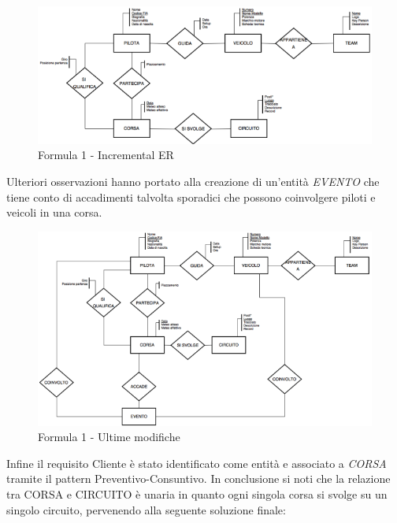 \begin{center}
\begin{figure}[H]
\centering
\includegraphics[scale=0.8]{figures/formula1_incER.png}
\caption{Formula 1 - Incremental ER} 
\end{figure}
\end{center}

Ulteriori osservazioni hanno portato alla creazione di un’entità \textit{EVENTO} che tiene conto di accadimenti talvolta sporadici che possono coinvolgere piloti e veicoli in una corsa.   

\begin{center}
\begin{figure}[H]
\centering
\includegraphics[scale=0.8]{figures/formula1_incER2.png}
\caption{Formula 1 - Ultime modifiche} 
\end{figure}
\end{center}

Infine il requisito Cliente è stato identificato come entità e associato a \textit{CORSA} tramite il pattern Preventivo-Consuntivo. In conclusione si noti che la relazione tra CORSA e CIRCUITO è unaria in quanto ogni singola corsa si svolge su un singolo circuito, pervenendo alla seguente soluzione finale: 

